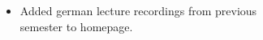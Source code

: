 \begin{frame}{\LectureFeedbackLectureTitle}
  \begin{itemize}
  \item Added german lecture recordings from previous\\
        semester to homepage. 
  \end{itemize}
\end{frame}
